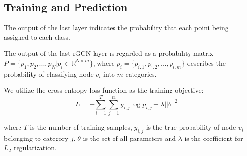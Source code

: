 \subsection{Training and Prediction}
The output of the last layer indicates the probability that each point being assigned to each class.

The output of the last rGCN layer is regarded as a probability matrix $P=\{p_1,p_2,...,p_N|p_i\in \mathbb{R}^{N \times m}\}$, where $p_i=\{p_{i,1},p_{i,2},...,p_{i,m}\}$ describes the probability of classifying node $v_i$ into $m$ categories. 

We utilize the cross-entropy loss function as the training objective:
\begin{equation}
L=-\sum_{i=1}^T\sum_{j=1}^m y_{i,j}\log p_{i,j}+\lambda ||\theta||^2
\end{equation}

\noindent where $T$ is the number of training samples, $y_{i,j}$ is the true probability of node $v_i$ belonging to category $j$. $\theta$ is the set of all parameters and $\lambda$ is the coefficient for $L_2$  regularization.
